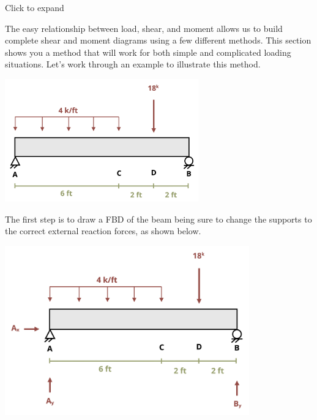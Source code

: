 \documentclass[
  letterpaper,
  DIV=11,
  numbers=noendperiod]{scrreprt}
\begin{document}
Click to expand

The easy relationship between load, shear, and moment allows us to build
complete shear and moment diagrams using a few different methods. This
section shows you a method that will work for both simple and
complicated loading situations. Let's work through an example to
illustrate this method.

\begin{tcolorbox}[enhanced jigsaw, colbacktitle=quarto-callout-note-color!10!white, title={Example 7.2}, coltitle=black, leftrule=.75mm, rightrule=.15mm, opacityback=0, breakable, colframe=quarto-callout-note-color-frame, left=2mm, arc=.35mm, colback=white, bottomrule=.15mm, bottomtitle=1mm, toptitle=1mm, titlerule=0mm, opacitybacktitle=0.6, toprule=.15mm]

\begin{center}
\includegraphics[width=3.29167in,height=\textheight]{images/CH7 PNGs/example 7.2 part 1.png}
\end{center}

The first step is to draw a FBD of the beam being sure to change the
supports to the correct external reaction forces, as shown below.

\begin{center}
\includegraphics[width=4.15625in,height=\textheight]{images/CH7 PNGs/example 7.2 part 2.png}
\end{center}


\end{tcolorbox}
\end{document}
